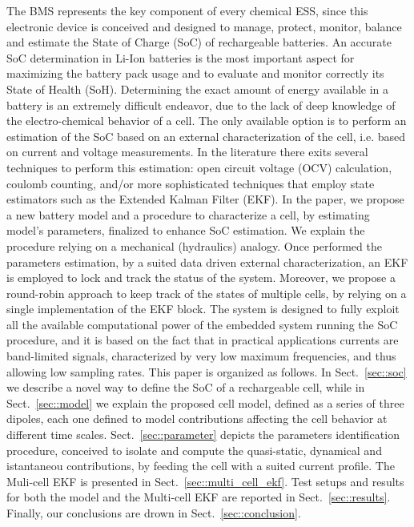 \documentclass[journal]{IEEEtran}
\begin{document}
The BMS represents the key component of every chemical ESS, since this electronic device is conceived and designed to manage, protect, monitor, balance and estimate the State of Charge (SoC) of rechargeable batteries. An accurate SoC determination in Li-Ion batteries is the most important aspect for maximizing the battery pack usage and to evaluate and monitor correctly its State of Health (SoH). Determining the exact amount of energy available in a battery is an extremely difficult endeavor, due to the lack of deep knowledge of the electro-chemical behavior of a cell. The only available option is to perform an estimation of the SoC based on an external characterization of the cell, i.e. based on current and voltage measurements. In the literature there exits several techniques to perform this estimation: open circuit voltage (OCV) calculation, coulomb counting, and/or more sophisticated techniques that employ state estimators such as the Extended Kalman Filter (EKF). In the paper, we propose a new battery model and a procedure to characterize a cell, by estimating model’s parameters, finalized to enhance SoC estimation. We explain the procedure relying on a mechanical (hydraulics) analogy. Once performed the parameters estimation, by a suited data driven external characterization, an EKF is employed to lock and track the status of the system. Moreover, we propose a round-robin approach to keep track of the states of multiple cells, by relying on a single implementation of the EKF block. The system is designed to fully exploit all the available computational power of the embedded system running the SoC procedure, and it is based on the fact that in practical applications currents are band-limited signals, characterized by very low maximum frequencies, and thus allowing low sampling rates. 
This paper is organized as follows. In Sect.~\ref{sec::soc} we describe a novel way to define the SoC of a rechargeable cell, while in Sect.~\ref{sec::model} we explain the proposed cell model, defined as a series of three dipoles, each one defined to model contributions affecting the cell behavior at different time scales. Sect.~\ref{sec::parameter} depicts the parameters identification procedure, conceived to isolate and compute the quasi-static, dynamical and istantaneou contributions, by feeding the cell with a suited current profile. The Muli-cell EKF is presented in Sect.~\ref{sec::multi_cell_ekf}. Test setups and results for both the model and the Multi-cell EKF are reported in Sect.~\ref{sec::results}. Finally, our conclusions are drown in Sect.~\ref{sec::conclusion}.
\end{document}
